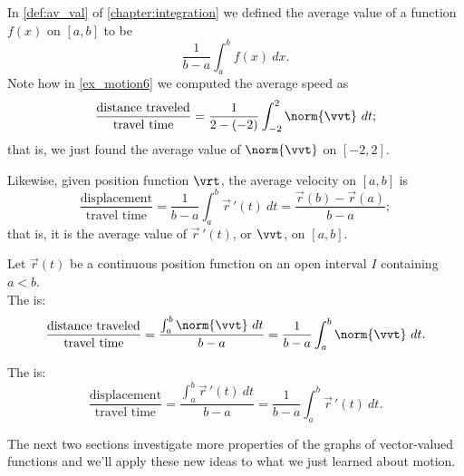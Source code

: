 In \autoref{def:av_val} of \autoref{chapter:integration} we defined the average value of a function $f(x)$ on $[a,b]$ to be
\[\frac{1}{b-a}\int_a^bf(x)\ dx.\]
Note how in \autoref{ex_motion6} we computed the average speed as
\[\frac{\text{distance traveled}}{\text{travel time}} = \frac1{2-(-2)}\int_{-2}^2\norm{\vvt}\ dt;\]
that is, we just found the average value of $\norm{\vvt}$ on $[-2,2]$.

Likewise, given position function $\vrt$, the average velocity on $[a,b]$ is
\[\frac{\text{displacement}}{\text{travel time}} = \frac1{b-a}\int_a^b \vec{r}\,'(t)\ dt = \frac{\vec r(b)-\vec r(a)}{b-a};\]
that is, it is the average value of $\vec r\,'(t)$, or $\vvt$, on $[a,b]$.\\

{Let $\vec r(t)$ be a continuous position function on an open interval $I$ containing $a<b$. \\

The  is:
\[\frac{\text{distance traveled}}{\text{travel time}} = \frac{\int_a^b \norm{\vvt}\ dt}{b-a} = \frac1{b-a}\int_a^b\norm{\vvt}\ dt.\]

The  is:
\[\frac{\text{displacement}}{\text{travel time}} = \frac{\int_a^b \vec{r}\,'(t)\ dt}{b-a} = \frac1{b-a}\int_a^b\vec{r}\,'(t)\ dt.\]}

The next two sections investigate more properties of the graphs of vector-valued functions and we'll apply these new ideas to what we just learned about motion.

